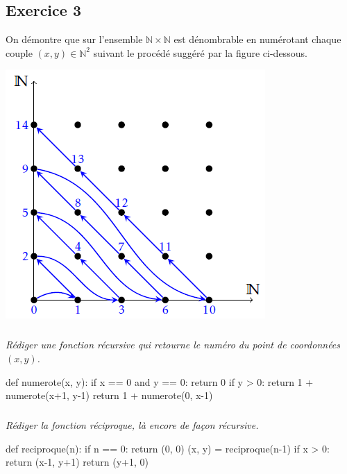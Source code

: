 \documentclass[10pt,fleqn]{book} %
\begin{document}
\begin{multicols}{2}
\section*{Exercice 3}
\setcounter{subparagraph}{0}
On démontre que sur l'ensemble $\mathbb{N}\times \mathbb{N}$ est dénombrable en numérotant chaque couple $(x,y)\in\mathbb{N}^2$ suivant le procédé suggéré par la figure ci-dessous.
\begin{center}
\includegraphics[width=.45\linewidth]{images/fig_01}
\end{center}

\subparagraph{}\textit{Rédiger une fonction récursive qui retourne le numéro du point de coordonnées $(x,y)$.}
\ifprof
\begin{corrige}
\begin{python}
def numerote(x, y):
    if x == 0 and y == 0:
        return 0
    if y > 0:
        return 1 + numerote(x+1, y-1)
    return 1 + numerote(0, x-1)
\end{python}
\end{corrige}
\else
\fi

\subparagraph{}\textit{Rédiger la fonction réciproque, là encore de façon récursive.}
\ifprof
\begin{corrige}
\begin{python}
def reciproque(n):
    if n == 0:
        return (0, 0)
    (x, y) = reciproque(n-1)
    if x > 0:
        return (x-1, y+1)
    return (y+1, 0)
\end{python}
\end{corrige}
\else
\fi

%
%


\end{multicols}
\end{document}
